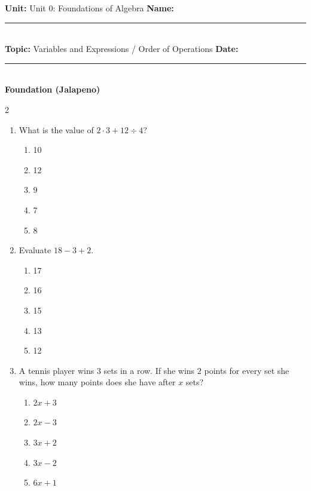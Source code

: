 \documentclass[10pt]{article}
\begin{document}
\enlargethispage{2.5cm}

\begin{tcolorbox}[colback=mainblue!5, colframe=mainblue, sharp corners, boxrule=0.5pt]
    \small \textbf{Unit:} Unit 0: Foundations of Algebra \hfill \textbf{Name:} \rule{3cm}{0.4pt} \\
    \small \textbf{Topic:} Variables and Expressions / Order of Operations \hfill \textbf{Date:} \rule{2cm}{0.4pt} \\
    \centering \textbf{\large Foundation (Jalapeno)}
\end{tcolorbox}

\vspace{0.2cm}

\begin{multicols}{2}
\begin{enumerate}[label=\textbf{Q\arabic*.}, leftmargin=*, itemsep=6pt, parsep=0pt]

  \item \small What is the value of $2 \cdot 3 + 12 \div 4$?
  \begin{enumerate}[label=(\Alph*), leftmargin=0.6cm, nosep, itemsep=2pt]
    \item 10
    \item 12
    \item 9
    \item 7
    \item 8
  \end{enumerate}

  \item \small Evaluate $18 - 3 + 2$.
  \begin{enumerate}[label=(\Alph*), leftmargin=0.6cm, nosep, itemsep=2pt]
    \item 17
    \item 16
    \item 15
    \item 13
    \item 12
  \end{enumerate}

  \item \small A tennis player wins $3$ sets in a row. If she wins $2$ points for every set she wins, how many points does she have after $x$ sets?
  \begin{enumerate}[label=(\Alph*), leftmargin=0.6cm, nosep, itemsep=2pt]
    \item $2x + 3$
    \item $2x - 3$
    \item $3x + 2$
    \item $3x - 2$
    \item $6x + 1$
  \end{enumerate}


\end{enumerate}
\end{multicols}
\end{document}
